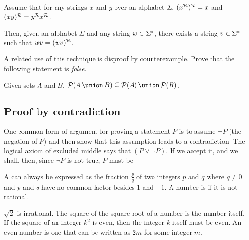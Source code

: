 \begin{stmt}
Assume that for any strings $x$ and $y$ over an alphabet $\Sigma$, $(x^{\mathcal{R}})^{\mathcal{R}} = x$ and $(xy)^{\mathcal{R}} = y^{\mathcal{R}}x^{\mathcal{R}}$.

Then, given an alphabet $\Sigma$ and any string $w \in \Sigma^{*}$, there exists a string $v \in \Sigma^{*}$ such that $wv = (wv)^{\mathcal{R}}$.
\end{stmt}

\begin{discussion}
A related use of this technique is disproof by counterexample. Prove that the following statement is \emph{false}.
\end{discussion}

\begin{stmt}
Given sets $A$ and $B$, $\powerset{\setunion{A}{B}} \subseteq \setunion{\powerset{A}}{\powerset{B}}$.
\end{stmt}

\subsection{Proof by contradiction}

\begin{discussion}
One common form of argument for proving a statement $P$ is to assume $\lnot P$ (the negation of $P$) and then show that this assumption leads to a contradiction. The logical axiom of excluded middle says that $(P \lor \lnot P)$. If we accept it, and we shall, then, since $\lnot P$ is not true, $P$ must be.
\end{discussion}

\begin{defn}
A  can always be expressed as the fraction $\frac p q$ of two integers $p$ and $q$ where $q \neq 0$ and $p$ and $q$ have no common factor besides $1$ and $-1$. A number is  if it is not rational.
\end{defn}

\begin{stmt}
$\sqrt 2$ is irrational.
\hint The square of the square root of a number is the number itself.
\hint If the square  of an integer $k^2$ is even, then the integer $k$ itself must be even.
\hint An even number is one that can be written as $2m$ for some integer $m$.
\end{stmt}

